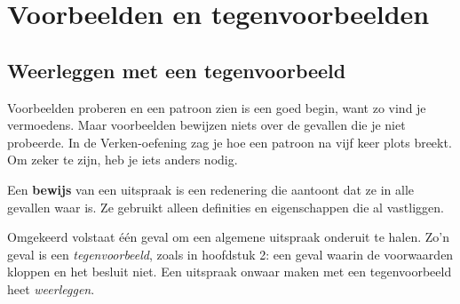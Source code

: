 \begin{oefeningen}[Start]

\end{oefeningen}


\section{Voorbeelden en tegenvoorbeelden}

\subsection{Weerleggen met een tegenvoorbeeld}

Voorbeelden proberen en een patroon zien is een goed begin, want zo vind je vermoedens. Maar voorbeelden bewijzen niets over de gevallen die je niet probeerde. In de Verken-oefening zag je hoe een patroon na vijf keer plots breekt. Om zeker te zijn, heb je iets anders nodig.

\begin{theorie}
Een \textbf{\textcolor{accent}{bewijs}} van een uitspraak is een redenering die aantoont dat ze in alle gevallen waar is. Ze gebruikt alleen definities en eigenschappen die al vastliggen.
\end{theorie}

Omgekeerd volstaat één geval om een algemene uitspraak onderuit te halen. Zo'n geval is een \textit{tegenvoorbeeld}, zoals in hoofdstuk 2: een geval waarin de voorwaarden kloppen en het besluit niet. Een uitspraak onwaar maken met een tegenvoorbeeld heet \textit{weerleggen}.


